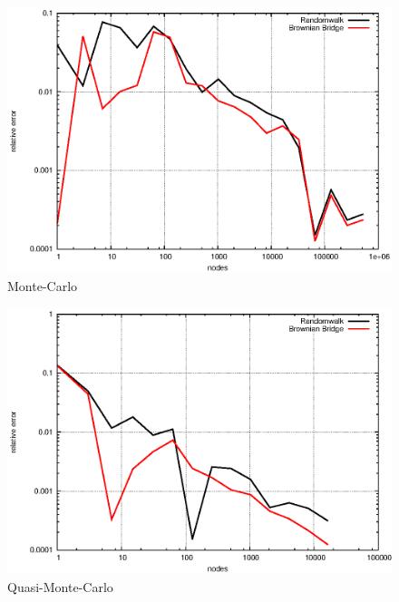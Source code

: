 \documentclass[]{article}
\begin{document}
\begin{figure}[!ht]
\centering
\includegraphics{task16_mc}
\caption{Monte-Carlo}
\label{fig:Task16e}
\end{figure}

\begin{figure}[!ht]
\centering
\includegraphics{task16_qmc}
\caption{Quasi-Monte-Carlo}
\label{fig:Task16f}
\end{figure}
\clearpage
\end{document}
